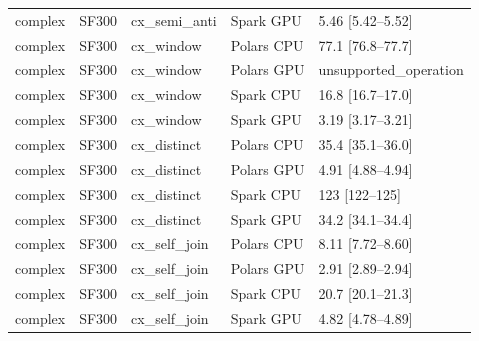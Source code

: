 \begin{longtable}{lllll}
complex & SF300 & cx\_semi\_anti & Spark GPU & 5.46 [5.42--5.52] \\
complex & SF300 & cx\_window & Polars CPU & 77.1 [76.8--77.7] \\
complex & SF300 & cx\_window & Polars GPU & unsupported\_operation \\
complex & SF300 & cx\_window & Spark CPU & 16.8 [16.7--17.0] \\
complex & SF300 & cx\_window & Spark GPU & 3.19 [3.17--3.21] \\
complex & SF300 & cx\_distinct & Polars CPU & 35.4 [35.1--36.0] \\
complex & SF300 & cx\_distinct & Polars GPU & 4.91 [4.88--4.94] \\
complex & SF300 & cx\_distinct & Spark CPU & 123 [122--125] \\
complex & SF300 & cx\_distinct & Spark GPU & 34.2 [34.1--34.4] \\
complex & SF300 & cx\_self\_join & Polars CPU & 8.11 [7.72--8.60] \\
complex & SF300 & cx\_self\_join & Polars GPU & 2.91 [2.89--2.94] \\
complex & SF300 & cx\_self\_join & Spark CPU & 20.7 [20.1--21.3] \\
complex & SF300 & cx\_self\_join & Spark GPU & 4.82 [4.78--4.89] \\
\end{longtable}
